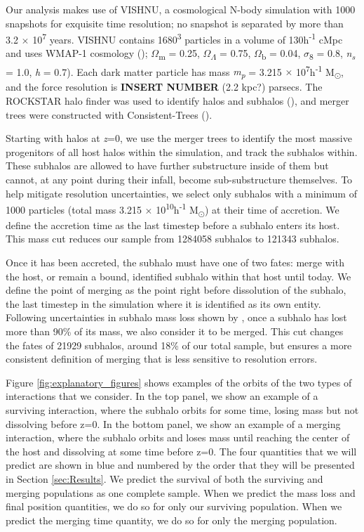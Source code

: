 \documentclass[fleqn,usenatbib]{mnras}
\newcommand\edits[1]{{\color{red}#1}}
\begin{document}
Our analysis makes use of VISHNU, a cosmological N-body simulation with 1000 snapshots for exquisite time resolution; no snapshot is separated by more than 3.2 $\times$ 10\textsuperscript{7} years. VISHNU contains 1680\textsuperscript{3} particles in a volume of 130h\textsuperscript{-1} cMpc and uses WMAP-1 cosmology (\citet{Spergel2003}); $\Omega$\textsubscript{m} = 0.25, $\Omega$\textsubscript{$\Lambda$} = 0.75, $\Omega$\textsubscript{b} = 0.04, $\sigma$\textsubscript{8} = 0.8, \textit{n\textsubscript{s}} = 1.0, \textit{h} = 0.7). Each dark matter particle has mass \textit{m\textsubscript{p}} = 3.215 $\times$ 10\textsuperscript{7}h\textsuperscript{-1} M\textsubscript{\(\odot\)}, and the force resolution is \edits{\textbf{INSERT NUMBER} (2.2 kpc?)} parsecs. The ROCKSTAR halo finder was used to identify halos and subhalos (\citet{Behroozi2013}), and merger trees were constructed with Consistent-Trees (\citet{Behroozi2013a}).

Starting with halos at \textit{z}=0, we use the merger trees to identify the most massive progenitors of all host halos within the simulation, and track the subhalos within. These subhalos are allowed to have further substructure inside of them but cannot, at any point during their infall, become sub-substructure themselves. To help mitigate resolution uncertainties, we select only subhalos with a minimum of 1000 particles (total mass 3.215 $\times$ 10\textsuperscript{10}h\textsuperscript{-1} M\textsubscript{\(\odot\)}) at their time of accretion. We define the accretion time as the last timestep before a subhalo enters its host. This mass cut reduces our sample from 1284058 subhalos to 121343 subhalos.

Once it has been accreted, the subhalo must have one of two fates: merge with the host, or remain a bound, identified subhalo within that host until today. We define the point of merging as the point right before dissolution of the subhalo, the last timestep in the simulation where it is identified as its own entity. Following uncertainties in subhalo mass loss shown by \citet{Bosch2018}, once a subhalo has lost more than 90\% of its mass, we also consider it to be merged. This cut changes the fates of 21929 subhalos, around 18\% of our total sample, but ensures a more consistent definition of merging that is less sensitive to resolution errors.
    
Figure \ref{fig:explanatory_figures} shows examples of the orbits of the two types of interactions that we consider. In the top panel, we show an example of a surviving interaction, where the subhalo orbits for some time, losing mass but not dissolving before z=0. In the bottom panel, we show an example of a merging interaction, where the subhalo orbits and loses mass until reaching the center of the host and dissolving at some time before z=0. The four quantities that we will predict are shown in blue and numbered by the order that they will be presented in Section \ref{sec:Results}. We predict the survival of both the surviving and merging populations as one complete sample. When we predict the mass loss and final position quantities, we do so for only our surviving population. When we predict the merging time quantity, we do so for only the merging population. 
\end{document}
